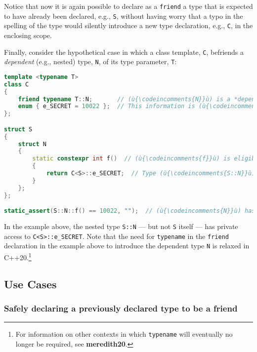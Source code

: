 \noindent Notice that now it is again possible to declare as a \texttt{friend} a
type that is expected to have already been declared, e.g., \texttt{S},
without having worry that a typo in the spelling of the type would
silently introduce a new type declaration, e.g., \texttt{C}, in the
enclosing scope.

Finally, consider the hypothetical case in which a class template,
\texttt{C}, befriends a \emph{dependent} (e.g., nested) type, \texttt{N},
of its type parameter, \texttt{T}:

\begin{lstlisting}[language=C++]
template <typename T>
class C
{
    friend typename T::N;       // (ù{\codeincomments{N}}ù) is a *dependent* *type* of parameter (ù{\codeincomments{T}}ù).
    enum { e_SECRET = 10022 };  // This information is (ù{\codeincomments{private}}ù) to class (ù{\codeincomments{C}}ù).
};

struct S
{
    struct N
    {
        static constexpr int f()  // (ù{\codeincomments{f}}ù) is eligible for compile-time computation.
        {
            return C<S>::e_SECRET;  // Type (ù{\codeincomments{S::N}}ù) is a (ù{\codeincomments{friend}}ù) of (ù{\codeincomments{C<S>}}ù).
        }
    };
};

static_assert(S::N::f() == 10022, "");  // (ù{\codeincomments{N}}ù) has (ù{\codeincomments{private}}ù) access to (ù{\codeincomments{C<S>}}ù).
\end{lstlisting}

\noindent In the example above, the nested type \texttt{S::N} --- but not
\texttt{S} itself --- has private access to \texttt{C<S>::e\_SECRET}.
Note that the need for \texttt{typename} in the \texttt{friend}
declaration in the example above to introduce the dependent type \texttt{N} is relaxed
in C++20.{\cprotect\footnote{For information on other contexts in which
\texttt{typename} will eventually no longer be required, see
  \mbox{\textbf{meredith20}}.}}

\subsection[Use Cases]{Use Cases}\label{use-cases}

\subsubsection[Safely declaring a previously declared type to be a friend]{Safely declaring a previously declared type to be a friend}\label{safely-declaring-a-previously-declared-type-to-be-a-friend}

